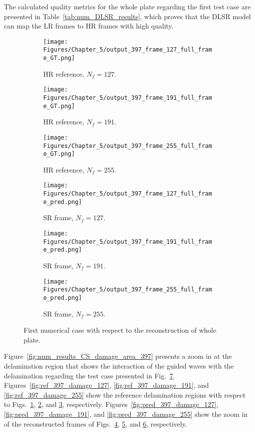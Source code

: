 The calculated quality metrics for the whole plate regarding the first test case are presented in Table~\ref{tab:num_DLSR_results}, which proves that the DLSR model can map the LR frames to HR frames with high quality.
\begin{figure}[!h]
	\centering
	\begin{subfigure}[b]{.32\textwidth}
		\centering
		\texttt{[image: Figures/Chapter\_5/output\_397\_frame\_127\_full\_frame\_GT.png]}
		\caption{HR reference, $N_f=127$.}
		\label{fig:ref_397_full_127}
	\end{subfigure}
	\begin{subfigure}[b]{.32\textwidth}
		\centering
		\texttt{[image: Figures/Chapter\_5/output\_397\_frame\_191\_full\_frame\_GT.png]}
		\caption{HR reference, $N_f=191$.}
		\label{fig:ref_397_full_191}
	\end{subfigure}
	\begin{subfigure}[b]{.32\textwidth}
		\centering
		\texttt{[image: Figures/Chapter\_5/output\_397\_frame\_255\_full\_frame\_GT.png]}
		\caption{HR reference, $N_f=255$.}
		\label{fig:ref_397_full_255}	
	\end{subfigure}
		\begin{subfigure}[b]{.32\textwidth}
		\centering
		\texttt{[image: Figures/Chapter\_5/output\_397\_frame\_127\_full\_frame\_pred.png]}
		\caption{SR frame, $N_f=127$.}
		\label{fig:pred_397_full_127}
	\end{subfigure}
	\begin{subfigure}[b]{.32\textwidth}
		\centering
		\texttt{[image: Figures/Chapter\_5/output\_397\_frame\_191\_full\_frame\_pred.png]}
		\caption{SR frame, $N_f=191$.}
		\label{fig:pred_397_full_191}
	\end{subfigure}
	\begin{subfigure}[b]{.32\textwidth}
		\centering
		\texttt{[image: Figures/Chapter\_5/output\_397\_frame\_255\_full\_frame\_pred.png]}
		\caption{SR frame, $N_f=255$.}
		\label{fig:pred_397_full_255}	
	\end{subfigure}
	\caption{First numerical case with respect to the reconstruction of whole plate.}
	\label{fig:num_results_CS_397}
\end{figure}

Figure~\ref{fig:num_results_CS_damage_area_397} presents a zoom in at the delamination region that shows the interaction of the guided waves with the delamination regarding the test case presented in Fig.~\ref{fig:num_results_CS_397}.
Figures~\ref{fig:ref_397_damage_127}, \ref{fig:ref_397_damage_191}, and \ref{fig:ref_397_damage_255} show the reference delamination regions with respect to Figs.~\ref{fig:ref_397_full_127}, \ref{fig:ref_397_full_191}, and \ref{fig:ref_397_full_255}, respectively.
Figures~\ref{fig:pred_397_damage_127}, \ref{fig:pred_397_damage_191}, and \ref{fig:pred_397_damage_255} show the zoom in of the reconstructed frames of Figs.~\ref{fig:pred_397_full_127}, \ref{fig:pred_397_full_191}, and \ref{fig:pred_397_full_255}, respectively.

